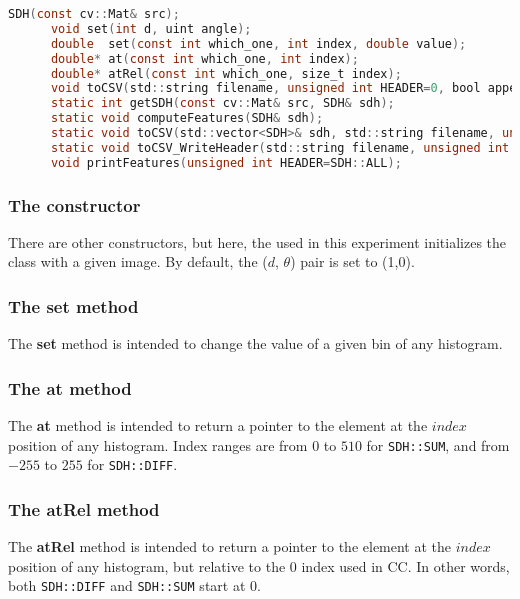 \begin{file}
  \begin{lstlisting}[language=C]
      SDH(const cv::Mat& src);
      void set(int d, uint angle);
      double  set(const int which_one, int index, double value);
      double* at(const int which_one, int index);
      double* atRel(const int which_one, size_t index);
      void toCSV(std::string filename, unsigned int HEADER=0, bool append=false, std::string name="SDH");
      static int getSDH(const cv::Mat& src, SDH& sdh);
      static void computeFeatures(SDH& sdh);
      static void toCSV(std::vector<SDH>& sdh, std::string filename, unsigned int HEADER=SDH::ALL);
      static void toCSV_WriteHeader(std::string filename, unsigned int HEADER=SDH::ALL);
      void printFeatures(unsigned int HEADER=SDH::ALL);
  \end{lstlisting}
\end{file}

\subsubsection{The constructor}
There are other constructors, but here, the used in this experiment
initializes the class with a given image.
By default, the ($d$, $\theta$) pair is set to (1,0).
 
\subsubsection{The set method}
The \textbf{set} method is intended to change the value of a given
bin of any histogram.

\subsubsection{The at method}
The \textbf{at} method is intended to return a pointer to the element
at the $index$ position of any histogram. Index ranges are from $0$ to $510$
for \texttt{SDH::SUM}, and from $-255$ to $255$ for \texttt{SDH::DIFF}.

\subsubsection{The atRel method}
The \textbf{atRel} method is intended to return a pointer to the element
at the $index$ position of any histogram, but relative to the $0$
index used in C\/C\+\+. In other words, both \texttt{SDH::DIFF} and 
\texttt{SDH::SUM} start at 0.


